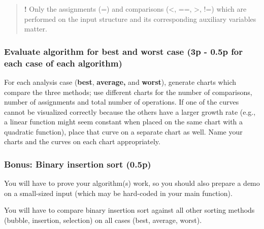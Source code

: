 \documentclass[../en-fa-lab.tex]{subfiles}
\begin{document}
\begin{quote}
\textbf{!} Only the assignments (=) and comparisons (\textless, ==,
\textgreater, !=) which are performed on the input structure and its
corresponding auxiliary variables matter.
\end{quote}

\subsubsection{Evaluate algorithm for best and worst case (3p - 0.5p for
each case of each
algorithm)}\label{evaluate-algorithm-for-best-and-worst-case-3p---0.5p-for-each-case-of-each-algorithm}

For each analysis case (\textbf{best}, \textbf{average,} and
\textbf{worst}), generate charts which compare the three methods; use
different charts for the number of comparisons, number of assignments
and total number of operations. If one of the curves cannot be
visualized correctly because the others have a larger growth rate (e.g.,
a linear function might seem constant when placed on the same chart with
a quadratic function), place that curve on a separate chart as well.
Name your charts and the curves on each chart appropriately.

\subsubsection{Bonus: Binary insertion sort
(0.5p)}\label{bonus-binary-insertion-sort-0.5p}

You will have to prove your algorithm(s) work, so you should also
prepare a demo on a small-sized input (which may be hard-coded in your
main function).

You will have to compare binary insertion sort against all other sorting
methods (bubble, insertion, selection) on all cases (best, average,
worst).
\end{document}
